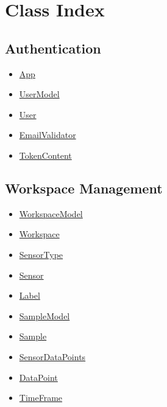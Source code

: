 \section{Class Index}

\subsection{Authentication}
\begin{itemize}
    \item \hyperref[App]{App}
    \item \hyperref[UserModel]{UserModel}
    \item \hyperref[User]{User}
    \item \hyperref[EmailValidator]{EmailValidator}
    \item \hyperref[TokenContent]{TokenContent}
\end{itemize}

\subsection{Workspace Management}
\begin{itemize}
    \item \hyperref[WorkspaceModel]{WorkspaceModel}
    \item \hyperref[wm-Workspace]{Workspace}
    \item \hyperref[SensorType]{SensorType}
    \item \hyperref[Sensor]{Sensor}
    \item \hyperref[Label]{Label}
    \item \hyperref[SampleModel]{SampleModel}
    \item \hyperref[Sample]{Sample}
    \item \hyperref[SensorDataPoints]{SensorDataPoints}
    \item \hyperref[DataPoint]{DataPoint}
    \item \hyperref[TimeFrame]{TimeFrame}
\end{itemize}

